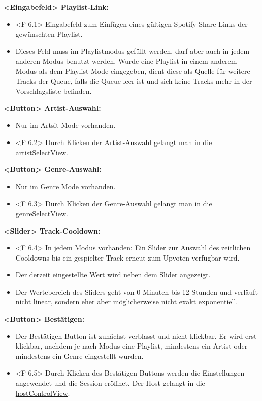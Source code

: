 \documentclass[oneside, ngerman]{sdqtechreport}
\begin{document}
\textbf{<Eingabefeld> Playlist-Link:}
\begin{itemize}
    \item <F 6.1> Eingabefeld zum Einfügen eines gültigen Spotify-Share-Links der gewünschten Playlist.
    \item Dieses Feld muss im Playlistmodus gefüllt werden, darf aber auch in jedem anderen Modus benutzt werden. Wurde eine Playlist in einem anderem Modus als dem Playlist-Mode eingegeben, dient diese als Quelle für weitere Tracks der Queue, falls die Queue leer ist und sich keine Tracks mehr in der Vorschlagsliste befinden.
\end{itemize}

\textbf{<Button> Artist-Auswahl:}
\begin{itemize}
    \item Nur im Artsit Mode vorhanden.
    \item <F 6.2> Durch Klicken der Artist-Auswahl gelangt man in die  \hyperlink{artistSelectView}{artistSelectView}.
\end{itemize}

\textbf{<Button> Genre-Auswahl:}
\begin{itemize}
    \item Nur im Genre Mode vorhanden.
    \item <F 6.3> Durch Klicken der Genre-Auswahl gelangt man in die  \hyperlink{genreSelectView}{genreSelectView}.
\end{itemize}

\textbf{<Slider> Track-Cooldown:}
\begin{itemize}
    \item <F 6.4> In jedem Modus vorhanden: Ein Slider zur Auswahl des zeitlichen Cooldowns bis ein gespielter Track erneut zum Upvoten verfügbar wird.
    \item Der derzeit eingestellte Wert wird neben dem Slider angezeigt.
    \item Der Wertebereich des Sliders geht von 0 Minuten bis 12 Stunden und verläuft nicht linear, sondern eher aber möglicherweise nicht exakt exponentiell.
\end{itemize}

\textbf{<Button> Bestätigen:}
\begin{itemize}
    \item Der Bestätigen-Button ist zunächst verblasst und nicht klickbar. Er wird erst klickbar, nachdem je nach Modus eine Playlist, mindestens ein Artist oder mindestens ein Genre eingestellt wurden.
    \item <F 6.5> Durch Klicken des Bestätigen-Buttons werden die Einstellungen angewendet und die Session eröffnet. Der Host gelangt in die \hyperlink{hostControlView}{hostControlView}.
\end{itemize}
\end{document}
